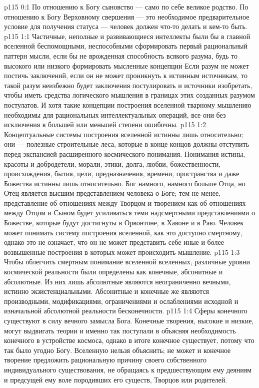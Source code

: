 \vs p115 0:1 По отношению к Богу сыновство --- само по себе великое родство. По отношению к Богу Верховному свершения --- это необходимое предварительное условие для получения статуса --- человек должен что\hyp{}то делать и кем\hyp{}то быть.
\vs p115 1:1 Частичные, неполные и развивающиеся интеллекты были бы в главной вселенной беспомощными, неспособными сформировать первый рациональный паттерн мысли, если бы не врожденная способность всякого разума, будь то высокого или низкого формировать мысленные концепции  Если разум не может постичь заключений, если он не может проникнуть к истинным источникам, то такой разум неизбежно будет заключения постулировать и источники изобретать, чтобы иметь средства логического мышления в границах этих созданных разумом постулатов. И хотя такие концепции построения вселенной тварному мышлению необходимы для рациональных интеллектуальных операций, все они без исключения в большей или меньшей степени ошибочны.
\vs p115 1:2 Концептуальные системы построения вселенной истинны лишь относительно; они --- полезные строительные леса, которые в конце концов должны отступить перед экспансией расширенного космического понимания. Понимания истины, красоты и добродетели, морали, этики, долга, любви, божественности, происхождения, бытия, цели, предназначения, времени, пространства и даже Божества истинны лишь относительно. Бог намного, намного больше Отца, но Отец является высшим представлением человека о Боге; тем не менее, представление об отношениях между Творцом и творением как об отношениях между Отцом и Сыном будет усиливаться теми надсмертными представлениями о Божестве, которые будут достигнуты в Орвонтоне, в Хавоне и в Раю. Человек может понимать систему построения вселенной, как это доступно смертному, однако это не означает, что он не может представить себе иные и более возвышенные построения в которых может происходить мышление.
\vs p115 1:3 Чтобы облегчить смертным понимание вселенной вселенных, различные уровни космической реальности были определены как конечные, абсонитные и абсолютные. Из них лишь абсолютные являются неограниченно вечными, истинно экзистенциальными. Абсонитные и конечные же являются производными, модификациями, ограничениями и ослаблениями исходной и изначальной абсолютной реальности бесконечности.
\vs p115 1:4 Сферы конечного существуют в силу вечного замысла Бога. Конечные творения, высокие и низкие, могут выдвигать теории и именно так поступали в объясняя необходимость конечного в устройстве космоса, однако в итоге конечное существует, потому что так было угодно Богу. Вселенную нельзя объяснить; не может и конечное творение предложить рациональную причину своего собственного индивидуального существования, не обращаясь к предшествующим ему деяниям и предсущей ему воле породивших его существ, Творцов или родителей.
